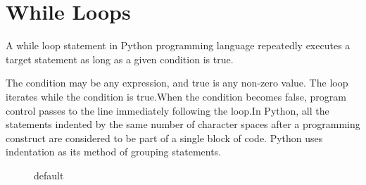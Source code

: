 \allsectionsfont{\centering \normalfont\scshape}
\section{\textbf{While Loops}}

A {\color{red}while loop} statement in Python programming language repeatedly executes a target statement as long as a given condition is true.

\vspace{1cm}
The condition may be any expression, and true is any non-zero value. The loop iterates while the condition is true.When the condition becomes false, program control passes to the line immediately following the loop.In Python, all the statements indented by the same number of character spaces after a programming construct are considered to be part of a single block of code. Python uses indentation as its method of grouping statements.

\begin{figure}[htbp]
\begin{center}

\caption{default}
\label{default}
\end{center}
\end{figure}
